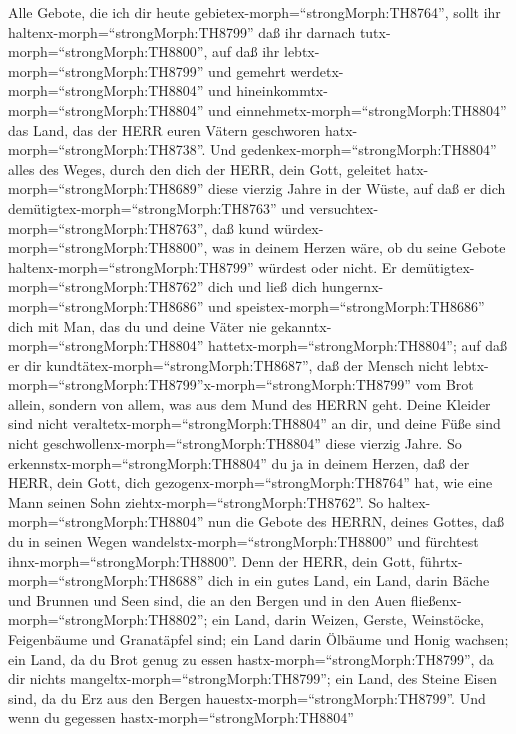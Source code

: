  Alle Gebote, die ich dir heute
gebietex-morph=``strongMorph:TH8764'', sollt ihr
haltenx-morph=``strongMorph:TH8799'' daß ihr darnach
tutx-morph=``strongMorph:TH8800'', auf daß ihr
lebtx-morph=``strongMorph:TH8799'' und gemehrt
werdetx-morph=``strongMorph:TH8804'' und
hineinkommtx-morph=``strongMorph:TH8804'' und
einnehmetx-morph=``strongMorph:TH8804'' das Land, das der HERR euren
Vätern geschworen hatx-morph=``strongMorph:TH8738''.  Und
gedenkex-morph=``strongMorph:TH8804'' alles des Weges, durch den dich
der HERR, dein Gott, geleitet hatx-morph=``strongMorph:TH8689'' diese
vierzig Jahre in der Wüste, auf daß er dich
demütigtex-morph=``strongMorph:TH8763'' und
versuchtex-morph=``strongMorph:TH8763'', daß kund
würdex-morph=``strongMorph:TH8800'', was in deinem Herzen wäre, ob du
seine Gebote haltenx-morph=``strongMorph:TH8799'' würdest oder nicht.
 Er demütigtex-morph=``strongMorph:TH8762'' dich und ließ
dich hungernx-morph=``strongMorph:TH8686'' und
speistex-morph=``strongMorph:TH8686'' dich mit Man, das du und deine
Väter nie gekanntx-morph=``strongMorph:TH8804''
hattetx-morph=``strongMorph:TH8804''; auf daß er dir
kundtätex-morph=``strongMorph:TH8687'', daß der Mensch nicht
lebtx-morph=``strongMorph:TH8799''x-morph=``strongMorph:TH8799'' vom
Brot allein, sondern von allem, was aus dem Mund des HERRN geht.
 Deine Kleider sind nicht
veraltetx-morph=``strongMorph:TH8804'' an dir, und deine Füße sind nicht
geschwollenx-morph=``strongMorph:TH8804'' diese vierzig Jahre.
 So erkennstx-morph=``strongMorph:TH8804'' du ja in deinem
Herzen, daß der HERR, dein Gott, dich
gezogenx-morph=``strongMorph:TH8764'' hat, wie eine Mann seinen Sohn
ziehtx-morph=``strongMorph:TH8762''.  So
haltex-morph=``strongMorph:TH8804'' nun die Gebote des HERRN, deines
Gottes, daß du in seinen Wegen wandelstx-morph=``strongMorph:TH8800''
und fürchtest ihnx-morph=``strongMorph:TH8800''.  Denn der
HERR, dein Gott, führtx-morph=``strongMorph:TH8688'' dich in ein gutes
Land, ein Land, darin Bäche und Brunnen und Seen sind, die an den Bergen
und in den Auen fließenx-morph=``strongMorph:TH8802'';  ein
Land, darin Weizen, Gerste, Weinstöcke, Feigenbäume und Granatäpfel
sind; ein Land darin Ölbäume und Honig wachsen;  ein Land,
da du Brot genug zu essen hastx-morph=``strongMorph:TH8799'', da dir
nichts mangeltx-morph=``strongMorph:TH8799''; ein Land, des Steine Eisen
sind, da du Erz aus den Bergen hauestx-morph=``strongMorph:TH8799''.
 Und wenn du gegessen hastx-morph=``strongMorph:TH8804''
